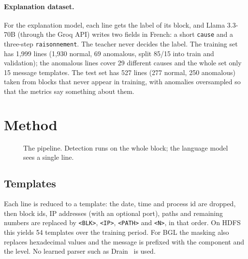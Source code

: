 \documentclass[11pt,a4paper]{article}
\newcommand{\code}[1]{\texttt{#1}}
\begin{document}
\paragraph{Explanation dataset.} For the explanation model, each line gets the label of its
block, and Llama 3.3-70B (through the Groq API) writes two fields in French: a short
\code{cause} and a three-step \code{raisonnement}. The teacher never decides the label. The
training set has 1,999 lines (1,930 normal, 69 anomalous, split 85/15 into train and
validation); the anomalous lines cover 29 different causes and the whole set only 15 message
templates. The test set has 527 lines (277 normal, 250 anomalous) taken from blocks that never
appear in training, with anomalies oversampled so that the metrics say something about them.

\section{Method}

\begin{figure}[t]
\centering
{}
\caption{The pipeline. Detection runs on the whole block; the language model sees a single line.}
\label{fig:pipeline}
\end{figure}

\subsection{Templates}
Each line is reduced to a template: the date, time and process id are dropped, then block
ids, IP addresses (with an optional port), paths and remaining numbers are replaced by
\code{<BLK>}, \code{<IP>}, \code{<PATH>} and \code{<N>}, in that order. On HDFS this yields 54
templates over the training period. For BGL the masking also replaces hexadecimal values and
the message is prefixed with the component and the level. No learned parser such as
Drain~\cite{he2017drain} is used.
\end{document}
